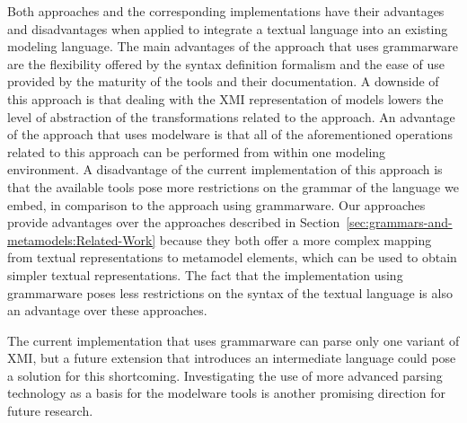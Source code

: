 Both approaches and the corresponding implementations have their advantages and disadvantages when applied to integrate a textual language into an existing modeling language.
The main advantages of the approach that uses grammarware are the flexibility offered by the syntax definition formalism and the ease of use provided by the maturity of the tools and their documentation.
A downside of this approach is that dealing with the XMI representation of models lowers the level of abstraction of the transformations related to the approach.
An advantage of the approach that uses modelware is that all of the aforementioned operations related to this approach can be performed from within one modeling environment.
A disadvantage of the current implementation of this approach is that the available tools pose more restrictions on the grammar of the language we embed, in comparison to the approach using grammarware.
Our approaches provide advantages over the approaches described in Section~\ref{sec:grammars-and-metamodels:Related-Work} because they both offer a more complex mapping from textual representations to metamodel elements, which can be used to obtain simpler textual representations.
The fact that the implementation using grammarware poses less restrictions on the syntax of the textual language is also an advantage over these approaches.


The current implementation that uses grammarware can parse only one variant of XMI, but a future extension that introduces an intermediate language could pose a solution for this shortcoming.
Investigating the use of more advanced parsing technology as a basis for the modelware tools is another promising direction for future research. 